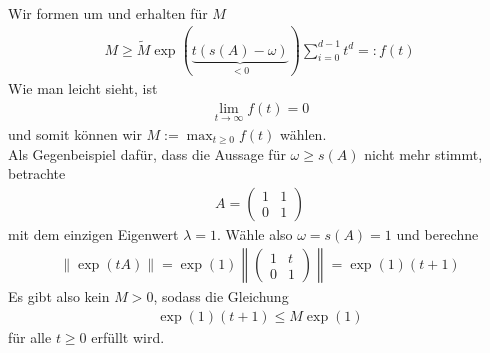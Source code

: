 \begin{solution}
\begin{align*}
\end{align*}
Wir formen um und erhalten für $M$
\begin{align*}
  M\geq \widetilde{M}\exp(\underbrace{t(s(A) - \omega)}_{< 0})\sum_{i=0}^{d-1} t^d =: f(t)
\end{align*}
Wie man leicht sieht, ist
\begin{align*}
  \lim_{t \to \infty}f(t) = 0
\end{align*}
und somit können wir $M := \max_{t \geq 0} f(t)$ wählen. \\
Als Gegenbeispiel dafür, dass die Aussage für $\omega \geq s(A)$ nicht mehr stimmt,
betrachte
\begin{align*}
  A = \begin{pmatrix}
    1 & 1 \\ 0 & 1
  \end{pmatrix}
\end{align*}
mit dem einzigen Eigenwert $\lambda = 1$. Wähle also $\omega = s(A) = 1$ und berechne
\begin{align*}
  \|\exp(tA)\| = \exp(1)\left\|\begin{pmatrix}
    1 & t \\ 0 & 1
  \end{pmatrix}\right\|
  = \exp(1)(t+1)
\end{align*}
Es gibt also kein $M > 0$, sodass die Gleichung
\begin{align*}
  \exp(1)(t+1) \leq M \exp(1)
\end{align*}
für alle $t \geq 0$ erfüllt wird.
\end{solution}
